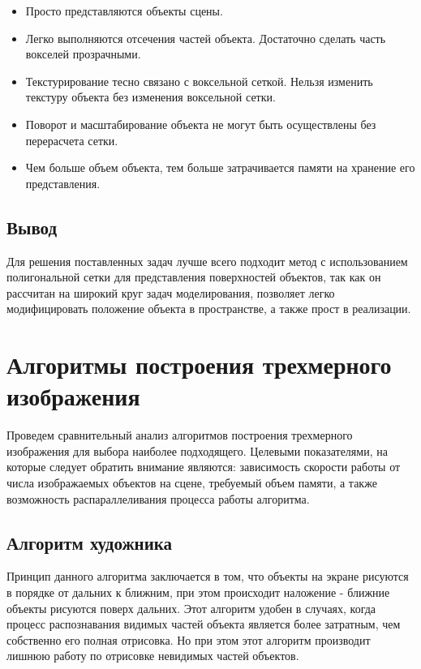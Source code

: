 \begin{itemize}
	\item Просто представляются объекты сцены.
	\item Легко выполняются отсечения частей объекта. Достаточно сделать часть вокселей прозрачными.
	\item Текстурирование тесно связано с воксельной сеткой. Нельзя изменить текстуру объекта без изменения воксельной сетки.
	\item Поворот и масштабирование объекта не могут быть осуществлены без перерасчета сетки.
	\item Чем больше объем объекта, тем больше затрачивается памяти на хранение его представления.
\end{itemize}

\subsection{Вывод}

Для решения поставленных задач лучше всего подходит метод с использованием полигональной сетки для представления поверхностей объектов, так как он рассчитан на широкий круг задач моделирования, позволяет легко модифицировать положение объекта в пространстве, а также прост в реализации.

\section{Алгоритмы построения трехмерного изображения}

Проведем сравнительный анализ алгоритмов построения трехмерного изображения для выбора наиболее подходящего. Целевыми показателями, на которые следует обратить внимание являются: зависимость скорости работы от числа изображаемых объектов на сцене, требуемый объем памяти, а также возможность распараллеливания процесса работы алгоритма.

\subsection{Алгоритм художника}

Принцип данного алгоритма заключается в том, что объекты на экране рисуются в порядке от дальних к ближним, при этом происходит наложение - ближние объекты рисуются поверх дальних. Этот алгоритм удобен в случаях, когда процесс распознавания видимых частей объекта является более затратным, чем собственно его полная отрисовка. Но при этом этот алгоритм производит лишнюю работу по отрисовке невидимых частей объектов.


